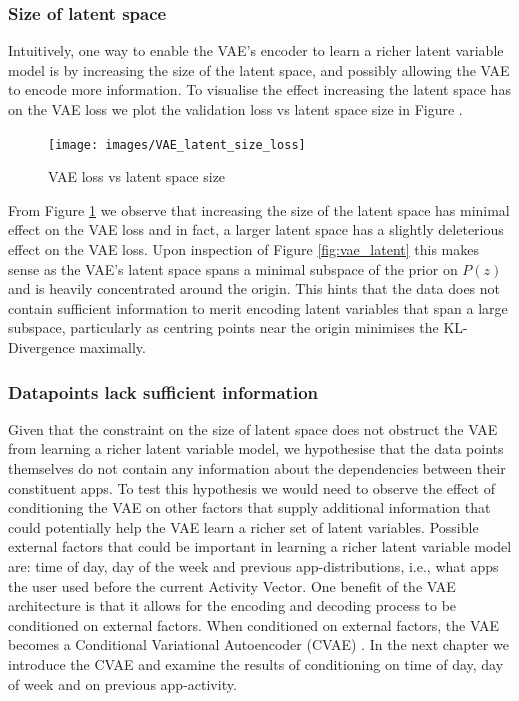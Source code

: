 \subsubsection{Size of latent space}
Intuitively, one way to enable the VAE's encoder to learn a richer latent variable model is by increasing the size of the latent space, and possibly allowing the VAE to encode more information. To visualise the effect increasing the latent space has on the VAE loss we plot the validation loss vs latent space size in Figure \label{fig:vae_loss}.

 \begin{figure}[htbp]
     \centering
     \texttt{[image: images/VAE\_latent\_size\_loss]}
     \caption{VAE loss vs latent space size}
     \label{fig:latent_size}
 \end{figure}

From Figure \ref{fig:latent_size} we observe that increasing the size of the latent space has minimal effect on the VAE loss and in fact, a larger latent space has a slightly deleterious effect on the VAE loss. Upon inspection of Figure \ref{fig:vae_latent} this makes sense as the VAE's latent space spans a minimal subspace of the prior on $P(z)$ and is heavily concentrated around the origin. This hints that the data does not contain sufficient information to merit encoding latent variables that span a large subspace, particularly as centring points near the origin minimises the KL-Divergence maximally.

\subsubsection{Datapoints lack sufficient information}
Given that the constraint on the size of latent space does not obstruct the VAE from learning a richer latent variable model, we hypothesise that the data points themselves do not contain any information about the dependencies between their constituent apps. To test this hypothesis we would need to observe the effect of conditioning the VAE on other factors that supply additional information that could potentially help the VAE learn a richer set of latent variables. Possible external factors that could be important in learning a richer latent variable model are: time of day, day of the week and previous app-distributions, i.e., what apps the user used before the current Activity Vector. One benefit of the VAE architecture is that it allows for the encoding and decoding process to be conditioned on external factors. When conditioned on external factors, the VAE becomes a Conditional Variational Autoencoder (CVAE) \citep{sohn2015learning, doersch2016tutorial}. In the next chapter we introduce the CVAE and examine the results of conditioning on time of day, day of week and on previous app-activity.


